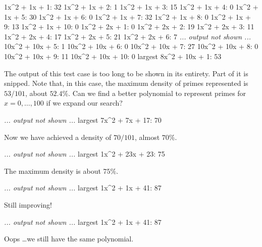\nextt
\begin{console}[frame=single, commandchars=\\\{\}]
    1x^2 +     1x +     1:    32
    1x^2 +     1x +     2:     1
    1x^2 +     1x +     3:    15
    1x^2 +     1x +     4:     0
    1x^2 +     1x +     5:    30
    1x^2 +     1x +     6:     0
    1x^2 +     1x +     7:    32
    1x^2 +     1x +     8:     0
    1x^2 +     1x +     9:    13
    1x^2 +     1x +    10:     0
    1x^2 +     2x +     1:     0
    1x^2 +     2x +     2:    19
    1x^2 +     2x +     3:    11
    1x^2 +     2x +     4:    17
    1x^2 +     2x +     5:    21
    1x^2 +     2x +     6:     7
\emph{... output not shown ...}
   10x^2 +    10x +     5:     1
   10x^2 +    10x +     6:     0
   10x^2 +    10x +     7:    27
   10x^2 +    10x +     8:     0
   10x^2 +    10x +     9:    11
   10x^2 +    10x +    10:     0
largest
    8x^2 +    10x +     1:    53
\end{console}
The output of this test case is too long to be shown in its entirety. Part of
it is snipped. Note that, in this case, the maximum density of primes
represented is $53/101$, about $52.4\%$. Can we find a better polynomial to
represent primes for $x = 0, \dots, 100$ if we expand our search?

\nextt
\begin{console}[frame=single, commandchars=\\\{\}]
\emph{... output not shown ...}
largest
    7x^2 +     7x +    17:    70
\end{console}
Now we have achieved a density of $70/101$, almost $70\%$.

\nextt
\begin{console}[frame=single, commandchars=\\\{\}]
\emph{... output not shown ...}
largest
    1x^2 +     23x +    23:    75
\end{console}
The maximum density is about $75\%$.

\nextt
\begin{console}[frame=single, commandchars=\\\{\}]
\emph{... output not shown ...}
largest
    1x^2 +     1x +    41:    87
\end{console}
Still improving!

\nextt
\begin{console}[frame=single, commandchars=\\\{\}]
\emph{... output not shown ...}
largest
    1x^2 +     1x +    41:    87
\end{console}
Oops \dots we still have the same polynomial.

